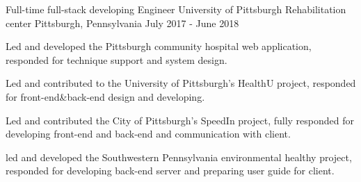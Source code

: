 \begin{cventries}
    \cventry
    {Full-time full-stack developing Engineer} %
    {University of Pittsburgh Rehabilitation center} %
    {Pittsburgh, Pennsylvania} %
    {July 2017 - June 2018}  %
    {
      \begin{cvitems}
      	\item {Led and developed the Pittsburgh community hospital web application, responded for technique support and system design.}
         \item {Led and contributed to the University of Pittsburgh's HealthU project, responded for front-end\&back-end design and developing.}
         \item {Led and contributed the City of Pittsburgh's SpeedIn project, fully responded for developing front-end and back-end and communication with client.}
        \item {led and developed the Southwestern Pennsylvania environmental healthy project, responded for developing back-end server and preparing user guide for client.}
      \end{cvitems}
    }
    
\end{cventries}
